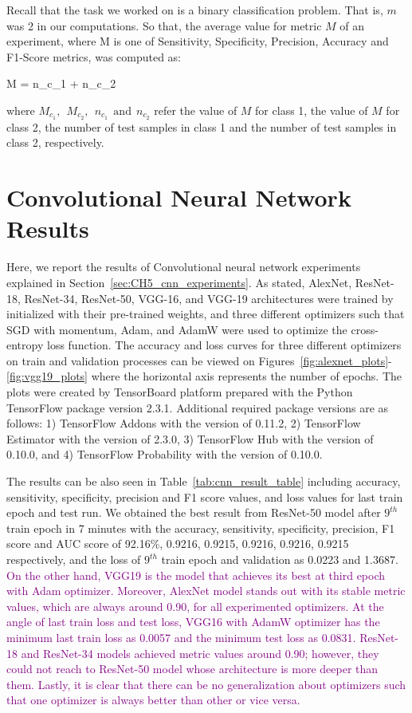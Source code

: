 Recall that the task we worked on is a binary classification problem. That is, $m$ was 2 in our computations. So that, the average value for metric $M$ of an experiment, where M is one of Sensitivity, Specificity, Precision, Accuracy and F1-Score metrics, was computed as:

\be
\label{eq:weighted_avg_binary_class_metric}
M =  {n_{c_{1}} + n_{c_{2}}} \:\: \raisepunct{,}
\ee

where $M_{c_{1}},\:\:M_{c_{2}},\:\:n_{c_{1}}\:\:\text{and}\:\:n_{c_{2}}$ refer the value of $M$ for class 1, the value of $M$ for class 2, the number of test samples in class 1 and the number of test samples in class 2, respectively.

\section{Convolutional Neural Network Results}

Here, we report the results of Convolutional neural network experiments explained in Section~\ref{sec:CH5_cnn_experiments}. As stated, AlexNet, ResNet-18, ResNet-34, ResNet-50, VGG-16, and VGG-19 architectures were trained by initialized with their pre-trained weights, and three different optimizers such that SGD with momentum, Adam, and AdamW were used to optimize the cross-entropy loss function. The accuracy and loss curves for three different optimizers on train and validation processes can be viewed on Figures~\ref{fig:alexnet_plots}-\ref{fig:vgg19_plots} where the horizontal axis represents the number of epochs. The plots were created by TensorBoard platform prepared with the Python TensorFlow package version 2.3.1. Additional required package versions are as follows: 1) TensorFlow Addons with the version of 0.11.2, 2) TensorFlow Estimator with the version of 2.3.0, 3) TensorFlow Hub with the version of 0.10.0, and 4) TensorFlow Probability with the version of 0.10.0.

The results can be also seen in Table~\ref{tab:cnn_result_table} including accuracy, sensitivity, specificity, precision and F1 score values, and loss values for last train epoch and test run. We obtained the best result from ResNet-50 model after $9^{th}$ train epoch in 7 minutes with the accuracy, sensitivity, specificity, precision, F1 score and AUC score of 92.16\%, 0.9216, 0.9215, 0.9216, 0.9216, 0.9215 respectively, and the loss of $9^{th}$ train epoch and validation as 0.0223 and 1.3687. \textcolor{purple}{On the other hand, VGG19 is the model that achieves its best at third epoch with Adam optimizer. Moreover, AlexNet model stands out with its stable metric values, which are always around 0.90, for all experimented optimizers. At the angle of last train loss and test loss, VGG16 with AdamW optimizer has the minimum last train loss as 0.0057 and the minimum test loss as 0.0831. ResNet-18 and ResNet-34 models achieved metric values around 0.90; however, they could not reach to ResNet-50 model whose architecture is more deeper than them. Lastly, it is clear that there can be no generalization about optimizers such that one optimizer is always better than other or vice versa.}
 
